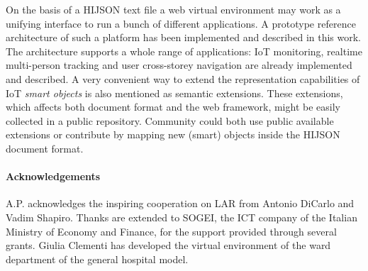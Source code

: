 \documentclass[]{egpubl}
\begin{document}
On the basis of a HIJSON text file a  web virtual
environment may work as a unifying interface to run a bunch of
different applications. A prototype reference architecture of such a platform has been
 implemented and described in this work. The architecture supports a whole
range of applications: IoT monitoring, realtime multi-person tracking and user
cross-storey navigation are already implemented and described. A very
convenient way to extend the representation capabilities of IoT \emph{smart objects} is
also mentioned as semantic extensions. These extensions, which affects both
document format and the web framework, might be easily collected in a public
repository. Community could both use public available extensions or contribute
by mapping new (smart) objects inside the HIJSON document format.


\paragraph*{Acknowledgements}

A.P. acknowledges the inspiring cooperation on LAR from Antonio DiCarlo and Vadim Shapiro. Thanks are extended to SOGEI, the ICT company of the Italian Ministry of Economy and Finance, for the support provided through several grants. Giulia Clementi has developed the virtual environment of the ward department of the general hospital model.

\balance

%



\end{document}
